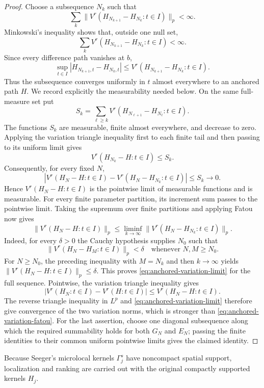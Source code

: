\documentclass[11pt]{article}
\numberwithin{equation}{section}
\theoremstyle{remark}
\theoremstyle{definition}
\newcommand{\norm}[1]{\lVert #1\rVert}
\begin{document}
\begin{proof}
Choose a subsequence $N_k$ such that
\[
 \sum_k\norm{V^r(H_{N_{k+1}}-H_{N_k}:t\in I)}_p<\infty.
\]
Minkowski's inequality shows that, outside one null set,
\[
 \sum_kV^r(H_{N_{k+1}}-H_{N_k}:t\in I)<\infty.
\]
Since every difference path vanishes at $b$,
\[
 \sup_{t\in I}|H_{N_{k+1},t}-H_{N_k,t}|
 \le V^r(H_{N_{k+1}}-H_{N_k}:t\in I).
\]
  Thus the subsequence converges uniformly in $t$ almost everywhere to an
  anchored path $H$.  We record explicitly the measurability needed below.
  On the same full-measure set put
  \[
   S_k=\sum_{\ell\ge k}
   V^r(H_{N_{\ell+1}}-H_{N_\ell}:t\in I).
  \]
  The functions $S_k$ are measurable, finite almost everywhere, and decrease
  to zero.  Applying the variation triangle inequality first to each finite
  tail and then passing to its uniform limit gives
  \[
   V^r(H_{N_k}-H:t\in I)\le S_k.
  \]
  Consequently, for every fixed $N$,
  \[
   \left|V^r(H_N-H:t\in I)
       -V^r(H_N-H_{N_k}:t\in I)\right|\le S_k\longrightarrow0.
  \]
  Hence $V^r(H_N-H:t\in I)$ is the pointwise limit of measurable
  functions and is measurable.  For every finite parameter partition, its
  increment sum passes to the pointwise limit.  Taking the supremum over
  finite partitions and applying Fatou now gives
\[
 \norm{V^r(H_N-H:t\in I)}_p
 \le\liminf_{k\to\infty}
 \norm{V^r(H_N-H_{N_k}:t\in I)}_p.
\]
Indeed, for every $\delta>0$ the Cauchy hypothesis supplies $N_0$ such
that
\[
 \norm{V^r(H_N-H_M:t\in I)}_p<\delta
 \quad\text{whenever }N,M\ge N_0.
\]
For $N\ge N_0$, the preceding inequality with $M=N_k$ and then
$k\to\infty$ yields
$\norm{V^r(H_N-H:t\in I)}_p\le\delta$.  This proves
\eqref{eq:anchored-variation-limit} for the full sequence.  Pointwise,
the variation triangle inequality gives
\[
 \big|V^r(H_N:t\in I)-V^r(H:t\in I)\big|
 \le V^r(H_N-H:t\in I).
\]
The reverse triangle inequality in $L^p$ and
\eqref{eq:anchored-variation-limit} therefore give convergence of the
two variation norms, which is stronger than
\eqref{eq:anchored-variation-fatou}.  For the last assertion, choose one
diagonal subsequence along which the required summability holds for both
$G_N$ and $E_N$; passing the finite identities to their common uniform
pointwise limits gives the claimed identity.
\end{proof}

Because Seeger's microlocal kernels $\Gamma_j^s$ have noncompact spatial
support, localization and ranking are carried out with the original
compactly supported kernels $H_j$.
\end{document}
